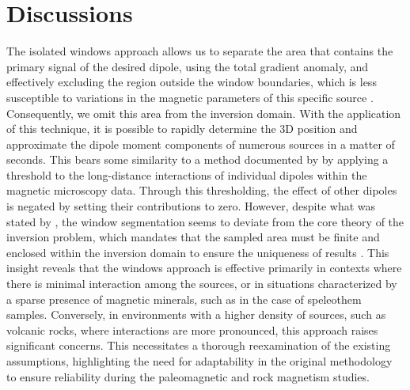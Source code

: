 \section{Discussions}








The isolated windows approach allows us to separate the area that contains the primary signal of the desired dipole, using the total gradient anomaly, and effectively excluding the region outside the window boundaries, which is less susceptible to variations in the magnetic parameters of this specific source \citep{Souza-Junior2023b}. Consequently, we omit this area from the inversion domain. With the application of this technique, it is possible to rapidly determine the 3D position and approximate the dipole moment components of numerous sources in a matter of seconds. This bears some similarity to a method documented by \cite{Weiss2007} by applying a threshold to the long-distance interactions of individual dipoles within the magnetic microscopy data. Through this thresholding, the effect of other dipoles is negated by setting their contributions to zero. However, despite what was stated by \cite{Souza-Junior2023b}, the window segmentation seems to deviate from the core theory of the inversion problem, which mandates that the sampled area must be finite and enclosed within the inversion domain to ensure the uniqueness of results \citep{Baratchart2013, Lima2013}. This insight reveals that the windows approach is effective primarily in contexts where there is minimal interaction among the sources, or in situations characterized by a sparse presence of magnetic minerals, such as in the case of speleothem samples. Conversely, in environments with a higher density of sources, such as volcanic rocks, where interactions are more pronounced, this approach raises significant concerns. This necessitates a thorough reexamination of the existing assumptions, highlighting the need for adaptability in the original methodology to ensure reliability during the paleomagnetic and rock magnetism studies.

